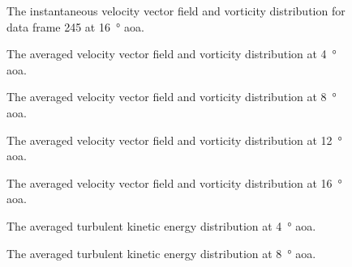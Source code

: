 \begin{figure}[htpb]
    \centering
    
    \caption{The instantaneous velocity vector field and vorticity distribution for data frame \num{245} at \qty{16}{\degree} \acrshort{aoa}.}
    \label{fig:full_instant_aoa16}
\end{figure}

\begin{figure}[htpb]
    \centering
    
    \caption{The averaged velocity vector field and vorticity distribution at \qty{4}{\degree} \acrshort{aoa}.}
    \label{fig:full_averaged_piv_aoa4}
\end{figure}

\begin{figure}[htpb]
    \centering
    
    \caption{The averaged velocity vector field and vorticity distribution at \qty{8}{\degree} \acrshort{aoa}.}
    \label{fig:full_averaged_piv_aoa8}
\end{figure}

\begin{figure}[htpb]
    \centering
    
    \caption{The averaged velocity vector field and vorticity distribution at \qty{12}{\degree} \acrshort{aoa}.}
    \label{fig:full_averaged_piv_aoa12}
\end{figure}

\begin{figure}[htpb]
    \centering
    
    \caption{The averaged velocity vector field and vorticity distribution at \qty{16}{\degree} \acrshort{aoa}.}
    \label{fig:full_averaged_piv_aoa16}
\end{figure}

\begin{figure}[htpb]
    \centering
    
    \caption{The averaged turbulent kinetic energy distribution at \qty{4}{\degree} \acrshort{aoa}.}
    \label{fig:full_averaged_ke_aoa4}
\end{figure}

\begin{figure}[htpb]
    \centering
    
    \caption{The averaged turbulent kinetic energy distribution at \qty{8}{\degree} \acrshort{aoa}.}
    \label{fig:full_averaged_ke_aoa8}
\end{figure}

